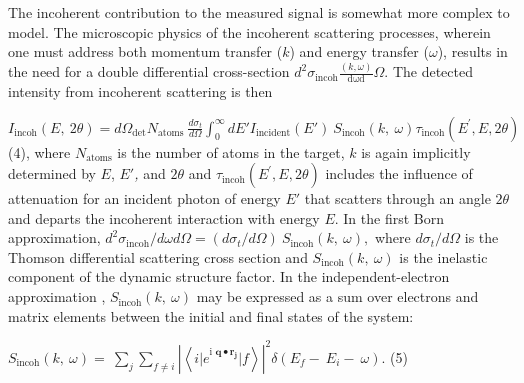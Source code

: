 The incoherent contribution to the measured signal is somewhat more
complex to model. The microscopic physics of the incoherent scattering
processes, wherein one must address both momentum transfer (\(k\)) and
energy transfer ($\omega$), results in the need for a double
differential cross-section
\(d^{2}\sigma_{\text{incoh}}\frac{\left( k,\omega \right)}{\text{dωd}}\Omega\).
The detected intensity from incoherent scattering is then

\(I_{\text{incoh}}\left( E,\ 2\theta \right) = d\Omega_{\det}N_{\text{atoms}}\ \frac{d\sigma_{t}}{d\Omega}\int_{0}^{\infty}{dE'I_{\text{incident}}\left( E' \right)}\ S_{\text{incoh}}\left( k,\ \omega \right)\tau_{\text{incoh}}\left( E^{'},E,2\theta \right)\)
(4),
where \(N_{\text{atoms}}\) is the number of atoms in the target, \(k\)
is again implicitly determined by \(E\), \(E'\)\emph{,} and \(2\theta\)
and \(\tau_{\text{incoh}}\left( E^{'},E,2\theta \right)\) includes the
influence of attenuation for an incident photon of energy \(E'\) that
scatters through an angle \(2\theta\) and departs the incoherent
interaction with energy \(E\). In the first Born approximation,
\(d^{2}\sigma_{\text{incoh}}/d\omega d\Omega = (d\sigma_{t}/d\Omega)\ S_{\text{incoh}}\left( k,\ \omega \right),\)
where \(d\sigma_{t}/d\Omega\) is the Thomson differential scattering
cross section and \(S_{\text{incoh}}\left( k,\ \omega \right)\) is the
inelastic component of the dynamic structure factor. In the
independent-electron approximation
 \cite{chihara2000interaction, schulke2007electron},
\(S_{\text{incoh}}\left( k,\ \omega \right)\) may be expressed as a sum
over electrons and matrix elements between the initial and final states
of the system:

\(S_{\text{incoh}}\left( k,\ \omega \right) = \ \sum_{j}^{}{\sum_{f \neq i}^{}{\left| \left\langle {i|e}^{\text{i\ }\mathbf{q \bullet}\mathbf{r}_{\mathbf{j}}}|f \right\rangle \right|^{2}\delta(E_{f} - \ E_{i} - \ \omega)}}\).
(5)

